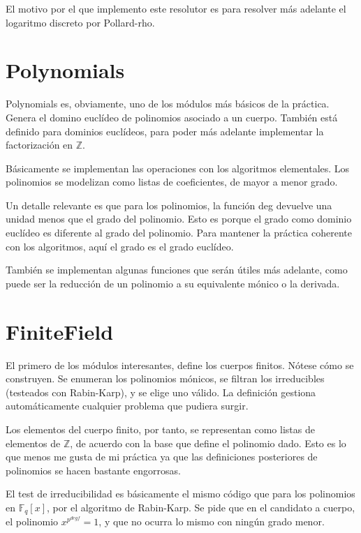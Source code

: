 \documentclass[12pt, a5paper]{article}
\theoremstyle{definition}
\begin{document}
El motivo por el que implemento este resolutor es para resolver más
adelante el logaritmo discreto por Pollard-rho.

\newpage\newpage

\section{Polynomials}
Polynomials es, obviamente, uno de los módulos más básicos de la
práctica. Genera el domino euclídeo de polinomios asociado a un
cuerpo. También está definido para dominios euclídeos, para poder más
adelante implementar la factorización en $\mathbb{Z}$.

Básicamente se implementan las operaciones con los algoritmos
elementales. Los polinomios se modelizan como listas de coeficientes,
de mayor a menor grado. 

Un detalle relevante es que para los polinomios, la función deg
devuelve una unidad menos que el grado del polinomio. Esto es porque
el grado como dominio euclídeo es diferente al grado del polinomio.
Para mantener la práctica coherente con los algoritmos, aquí el grado
es el grado euclídeo.

También se implementan algunas funciones que serán útiles más
adelante, como puede ser la reducción de un polinomio a su equivalente
mónico o la derivada.

\newpage\newpage

\section{FiniteField}
El primero de los módulos interesantes, define los cuerpos finitos.
Nótese cómo se construyen. Se enumeran los polinomios mónicos, se
filtran los irreducibles (testeados con Rabin-Karp), y se elige uno
válido. La definición gestiona automáticamente cualquier problema que
pudiera surgir.

Los elementos del cuerpo finito, por tanto, se representan como listas
de elementos de $\mathbb{Z}$, de acuerdo con la base que define el
polinomio dado. Esto es lo que menos me gusta de mi práctica ya que
las definiciones posteriores de polinomios se hacen bastante
engorrosas.

El test de irreducibilidad es básicamente el mismo código que para los polinomios
en $\mathbb{F}_q[x]$, por el algoritmo de Rabin-Karp. Se pide que en
el candidato a cuerpo, el polinomio $x^{p^{deg f}}=1$, y que no ocurra
lo mismo con ningún grado menor.
\end{document}

